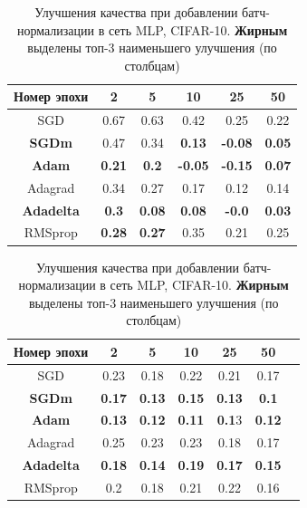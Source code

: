 \documentclass[12pt]{article}
\begin{document}
\begin{table}[h!]
\centering
\small
\begin{minipage}{0.45\linewidth}
\centering
\begin{tabular}{|c|c|c|c|c|c|}\hline
\textbf{Номер эпохи} & \textbf{2} & \textbf{5} & \textbf{10} & \textbf{25} & \textbf{50} \\\hline
SGD & 0.67 & 0.63 & 0.42 & 0.25 & 0.22 \\\hline

\textbf{SGDm} & 0.47 & 0.34 &  \textbf{0.13} &  \color{red}\textbf{-0.08} &  \textbf{0.05} \\\hline

\textbf{Adam} &  \textbf{0.21} &  \textbf{0.2} & \color{red}\textbf{-0.05} & \color{red}\textbf{-0.15} & \textbf{0.07} \\\hline

Adagrad & 0.34 & 0.27 & 0.17 & 0.12 & 0.14 \\\hline

\textbf{Adadelta} & \textbf{0.3} & \textbf{0.08} & \textbf{0.08} & \color{red}\textbf{-0.0} & \textbf{0.03} \\\hline

RMSprop & \textbf{0.28} & \textbf{0.27} & 0.35 & 0.21 & 0.25 \\\hline

\end{tabular}
\caption{\small Улучшения качества при добавлении батч-нормализации в сеть MLP, MNIST. \textbf{Жирным} выделены топ-3 наименьшего улучшения (по столбцам)} \label{table:3.mnist}
\end{minipage} \hfill
\begin{minipage}{0.45\linewidth}
\centering
\begin{tabular}{|c|c|c|c|c|c|c|}\hline
\textbf{Номер эпохи} & \textbf{2} & \textbf{5} & \textbf{10} & \textbf{25} & \textbf{50} \\\hline

SGD & 0.23 & 0.18 & 0.22 & 0.21 & 0.17 \\\hline

\textbf{SGDm} & \textbf{0.17} & \textbf{0.13} & \textbf{0.15} & \textbf{0.13} & \textbf{0.1} \\\hline

\textbf{Adam} & \textbf{0.13} &\textbf{ 0.12} & \textbf{0.11} & \textbf{0.1}3 & \textbf{0.12} \\\hline

Adagrad & 0.25 & 0.23 & 0.23 & 0.18 & 0.17 \\\hline

\textbf{Adadelta} & \textbf{0.18} & \textbf{0.14} & \textbf{0.19} & \textbf{0.17} & \textbf{0.15} \\\hline

RMSprop & 0.2 & 0.18 & 0.21 & 0.22 & 0.16 \\\hline

\end{tabular}
\caption{\small Улучшения качества при добавлении батч-нормализации в сеть MLP, CIFAR-10. \textbf{Жирным} выделены топ-3 наименьшего улучшения (по столбцам)} \label{table:3.cifar}
\end{minipage}
\end{table}
\end{document}
